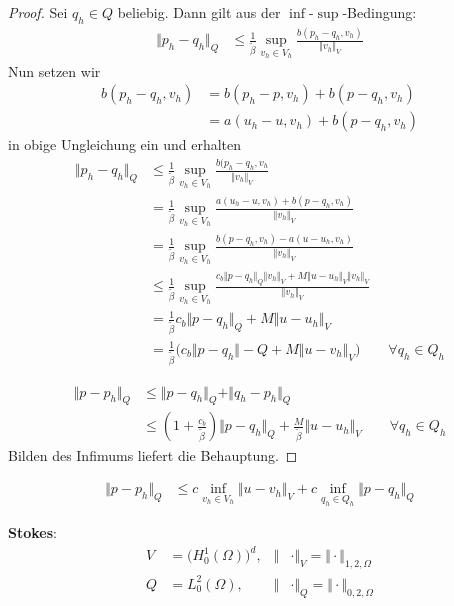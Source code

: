 \begin{proof}
	Sei $q_h\in Q$ beliebig. Dann gilt aus der $\inf$-$\sup$-Bedingung:
	\begin{align*}
		\Vert p_h-q_h\Vert_Q
		&\leq\frac{1}{\tilde{\beta}}\sup\limits_{v_h\in V_h}\frac{b(p_h-q_h,v_h)}{\Vert v_h\Vert_V}
	\end{align*}
	Nun setzen wir
	\begin{align*}
		b(p_h-q_h,v_h)
		&=b(p_h-p,v_h)+b(p-q_h,v_h)\\
		&=a(u_h-u,v_h)+b(p-q_h,v_h)
	\end{align*}
	in obige Ungleichung ein und erhalten
	\begin{align*}
		\Vert p_h-q_h\Vert_Q
		&\leq\frac{1}{\tilde{\beta}}\sup\limits_{v_h\in V_h}\frac{b(p_h-q_h,v_h}{\Vert v_h\Vert_V}\\
		&=\frac{1}{\tilde{\beta}}\sup\limits_{v_h\in V_h}\frac{a(u_h-u,v_h)+b(p-q_h,v_h)}{\Vert v_h\Vert_V}\\
		&=\frac{1}{\tilde{\beta}}\sup\limits_{v_h\in V_h}\frac{b(p-q_h,v_h)-a(u-u_h,v_h)}{\Vert v_h\Vert_V}\\
		&\leq\frac{1}{\tilde{\beta}}\sup\limits_{v_h\in V_h}\frac{c_b\Vert p-q_h\Vert_Q\Vert v_h\Vert_V+M\Vert u-u_h\Vert_V\Vert v_h\Vert_V}{\Vert v_h\Vert_V}\\
		&=\frac{1}{\tilde{\beta}}c_b\Vert p-q_h\Vert_Q+M\Vert u-u_h\Vert_V\\
		&=\frac{1}{\tilde{\beta}}\Big(c_b\Vert p-q_h\Vert-Q+M\Vert u-v_h\Vert_V\Big)\qquad\forall q_h\in Q_h
	\end{align*}
	
	\begin{align*}
		\Vert p-p_h\Vert_Q
		&\leq\Vert p-q_h\Vert_Q+\Vert q_h-p_h\Vert_Q\\
		&\leq \left(1+\frac{c_b}{\tilde{\beta}}\right)\Vert p-q_h\Vert_Q+\frac{M}{\tilde{\beta}}\Vert u-u_h\Vert_V\qquad\forall q_h\in Q_h
	\end{align*}
	Bilden des Infimums liefert die Behauptung.
\end{proof}

\begin{bemerkung}
	\begin{align*}
		\Vert p-p_h\Vert_Q
		&\leq c\inf\limits_{v_h\in V_h}\Vert u-v_h\Vert_V+c\inf\limits_{q_h\in Q_h}\Vert p-q_h\Vert_Q
	\end{align*}
\end{bemerkung}

\textbf{Stokes}:
\begin{align*}
	V&=\big(H_0^1(\Omega)\big)^d, &\Vert&\cdot\Vert_V=\Vert\cdot\Vert_{1,2,\Omega}\\
	Q&=L_0^2(\Omega), &\Vert&\cdot\Vert_Q=\Vert\cdot\Vert_{0,2,\Omega}
\end{align*}

